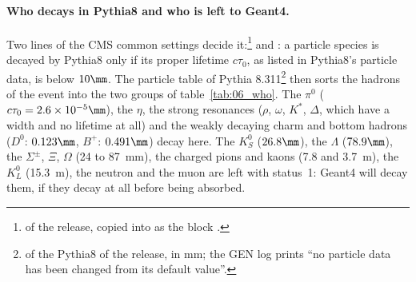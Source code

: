 \paragraph{Who decays in Pythia8 and who is left to Geant4.}
Two lines of the CMS common settings decide it:\footnote{
of the release, copied into  as the block .}
 and : a particle species is decayed by
Pythia8 only if its proper lifetime $c\tau_0$, as listed in Pythia8's particle data, is below $10\mm$. The
particle table of Pythia 8.311\footnote{ of the Pythia8 of the release,
 in mm; the GEN log prints ``no particle data has been changed from its default value''.} then sorts the
hadrons of the event into the two groups of table~\ref{tab:06_who}. The $\pi^0$ ($c\tau_0 = 2.6 \times 10^{-5}\mm$),
the $\eta$, the strong resonances ($\rho$, $\omega$, $K^*$, $\Delta$, which have a width and no lifetime at all) and
the weakly decaying charm and bottom hadrons ($D^0$: $0.123\mm$, $B^+$: $0.491\mm$) decay here. The $K^0_S$
($26.8\mm$), the $\Lambda$ ($78.9\mm$), the $\Sigma^\pm$, $\Xi$, $\Omega$ (24 to 87~mm), the charged pions
and kaons (7.8 and 3.7~m), the $K^0_L$ (15.3~m), the neutron and the muon are left with status~1: Geant4 will
decay them, if they decay at all before being absorbed.

